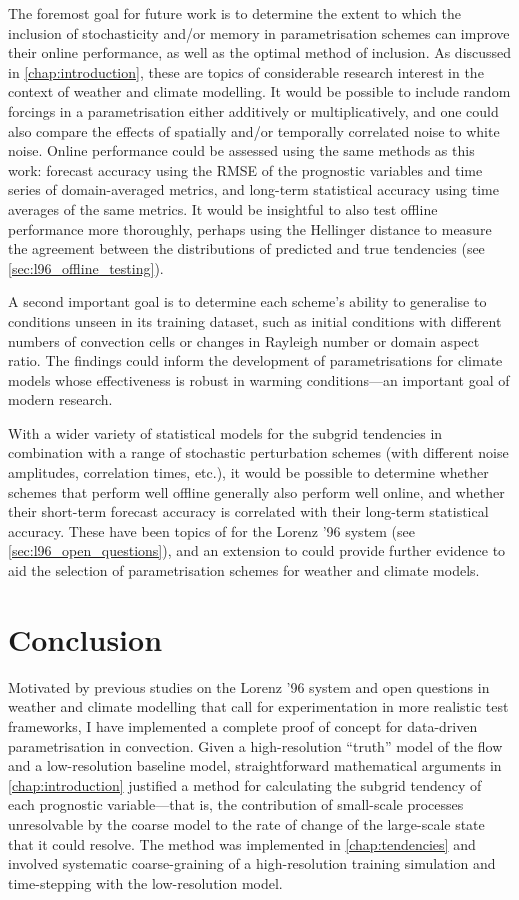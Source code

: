 \documentclass[../main.tex]{subfiles}
\begin{document}
The foremost goal for future work is to determine the extent to which the
inclusion of stochasticity and/or memory in parametrisation schemes can improve
their online performance, as well as the optimal method of inclusion. As
discussed in \cref{chap:introduction}, these are topics of considerable
research interest in the context of weather and climate modelling. It would be
possible to include random forcings in a parametrisation either additively or
multiplicatively, and one could also compare the effects of spatially and/or
temporally correlated noise to white noise. Online performance could be
assessed using the same methods as this work: forecast accuracy using the RMSE
of the prognostic variables and time series of domain-averaged metrics, and
long-term statistical accuracy using time averages of the same metrics. It
would be insightful to also test offline performance more thoroughly, perhaps
using the Hellinger distance to measure the agreement between the distributions
of predicted and true tendencies (see \cref{sec:l96_offline_testing}).

A second important goal is to determine each scheme's ability to generalise to
conditions unseen in its training dataset, such as initial conditions with
different numbers of convection cells or changes in Rayleigh number or domain
aspect ratio. The findings could inform the development of parametrisations
for climate models whose effectiveness is robust in warming conditions---an
important goal of modern research.

With a wider variety of statistical models for the subgrid tendencies in
combination with a range of stochastic perturbation schemes (with different
noise amplitudes, correlation times, etc.), it would be possible to determine
whether schemes that perform well offline generally also perform well online,
and whether their short-term forecast accuracy is correlated with their
long-term statistical accuracy. These have been topics of for the Lorenz '96
system (see \cref{sec:l96_open_questions}), and an extension to \rb{} could
provide further evidence to aid the selection of parametrisation schemes for
weather and climate models.


\section{Conclusion}
\label{sec:conclusion}
Motivated by previous studies on the Lorenz '96 system and open questions in
weather and climate modelling that call for experimentation in more realistic
test frameworks, I have implemented a complete proof of concept for data-driven
parametrisation in \rb{} convection. Given a high-resolution ``truth'' model of
the flow and a low-resolution baseline model, straightforward mathematical
arguments in \cref{chap:introduction} justified a method for calculating the
subgrid tendency of each prognostic variable---that is, the contribution of
small-scale processes unresolvable by the coarse model to the rate of change of
the large-scale state that it could resolve. The method was implemented in
\cref{chap:tendencies} and involved systematic coarse-graining of a
high-resolution training simulation and time-stepping with the low-resolution
model.
\end{document}
